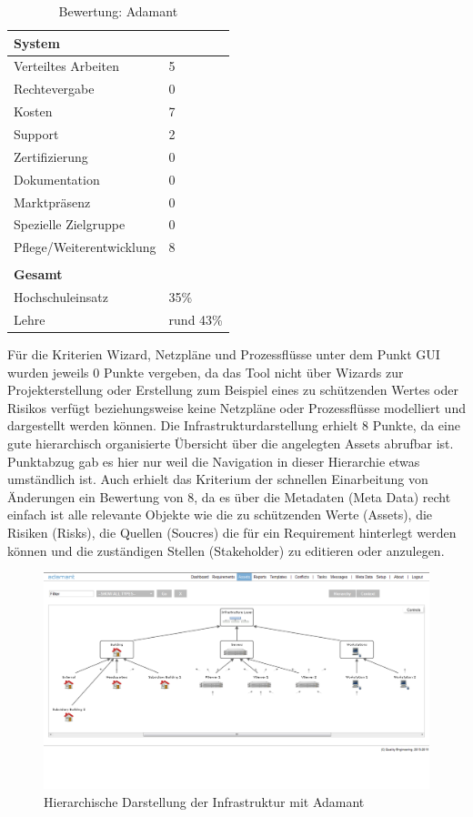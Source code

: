 \begin{table}[h!bt]
\begin{tabular}{|p{}|p{}|}
		\hline
		\textbf{System}&  \\
		\hline
		Verteiltes Arbeiten & 5 \\
		\hline
		Rechtevergabe & 0 \\
		\hline
		Kosten & 7 \\
		\hline
		Support & 2 \\
		\hline
		Zertifizierung & 0 \\
		\hline
		Dokumentation & 0 \\
		\hline
		Marktpräsenz & 0 \\
		\hline
		Spezielle Zielgruppe & 0 \\
		\hline
		Pflege/Weiterentwicklung & 8 \\
		\hline
		\multicolumn{2}{c}{}\\
		\hline
		\textbf{Gesamt} & \\
		\hline
		Hochschuleinsatz & 35\%\\
		\hline
		Lehre & rund 43\%\\
		\hline
	\end{tabular} 
	\caption{Bewertung: Adamant}
	\label{tab:BewertungAdamant}
\end{table}
Für die Kriterien Wizard, Netzpläne und Prozessflüsse unter dem Punkt GUI wurden jeweils 0 Punkte vergeben, da das Tool nicht über Wizards zur Projekterstellung oder Erstellung zum Beispiel eines zu schützenden Wertes oder Risikos verfügt beziehungsweise keine Netzpläne oder Prozessflüsse modelliert und dargestellt werden können. Die Infrastrukturdarstellung erhielt 8 Punkte, da eine gute hierarchisch organisierte Übersicht über die angelegten Assets abrufbar ist. Punktabzug gab es hier nur weil die Navigation in dieser Hierarchie etwas umständlich ist. Auch erhielt das Kriterium der schnellen Einarbeitung von Änderungen ein Bewertung von 8, da es über die Metadaten (Meta Data) recht einfach ist alle relevante Objekte wie die zu schützenden Werte (Assets), die Risiken (Risks), die Quellen (Soucres) die für ein Requirement hinterlegt werden können und die zuständigen Stellen (Stakeholder) zu editieren oder anzulegen.\\
\begin{figure}[h!bp]
\label{fig:admantHierarchie}
\includegraphics[scale=0.40]{images/adamant_hierarchie.png} 
\caption{Hierarchische Darstellung der Infrastruktur mit Adamant}
\end{figure}\\
